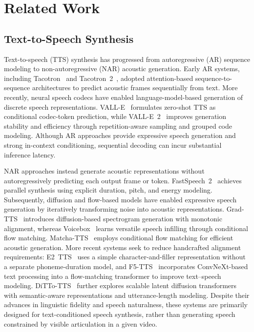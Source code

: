 
\section{Related Work}
\label{sec:related_work}

\subsection{Text-to-Speech Synthesis}
\label{subsec:related_tts}

Text-to-speech (TTS) synthesis has progressed from autoregressive (AR)
sequence modeling to non-autoregressive (NAR) acoustic generation.
Early AR systems, including Tacotron~\cite{wang2017tacotron} and
Tacotron~2~\cite{shen2018tacotron2}, adopted attention-based
sequence-to-sequence architectures to predict acoustic frames
sequentially from text. More recently, neural speech codecs have enabled
language-model-based generation of discrete speech representations.
VALL-E~\cite{wang2025valle} formulates zero-shot TTS as conditional
codec-token prediction, while VALL-E~2~\cite{chen2024valle2} improves
generation stability and efficiency through repetition-aware sampling
and grouped code modeling. Although AR approaches provide expressive
speech generation and strong in-context conditioning, sequential decoding
can incur substantial inference latency.

NAR approaches instead generate acoustic representations without
autoregressively predicting each output frame or token.
FastSpeech~2~\cite{ren2021fastspeech2} achieves parallel synthesis
using explicit duration, pitch, and energy modeling. Subsequently,
diffusion and flow-based models have enabled expressive speech generation
by iteratively transforming noise into acoustic representations.
Grad-TTS~\cite{popov2021gradtts} introduces diffusion-based spectrogram
generation with monotonic alignment, whereas Voicebox~\cite{le2023voicebox}
learns versatile speech infilling through conditional flow matching.
Matcha-TTS~\cite{mehta2024matchatts} employs conditional flow matching
for efficient acoustic generation. More recent systems seek to reduce
handcrafted alignment requirements: E2~TTS~\cite{eskimez2024e2tts}
uses a simple character-and-filler representation without a separate
phoneme-duration model, and F5-TTS~\cite{chen2025f5tts} incorporates
ConvNeXt-based text processing into a flow-matching transformer to
improve text--speech modeling. DiTTo-TTS~\cite{lee2025ditto}
further explores scalable latent diffusion transformers with
semantic-aware representations and utterance-length modeling.
Despite their advances in linguistic fidelity and speech naturalness,
these systems are primarily designed for text-conditioned speech
synthesis, rather than generating speech constrained by visible
articulation in a given video.


